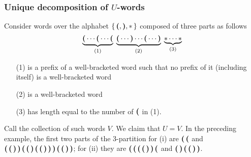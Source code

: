 \subsubsection*{Unique decomposition of $U$-words}
Consider words over the alphabet $\makeset{\pq, \oa, \ast}$ composed
of three parts as follows
\[
\underbrace{\pq \cdots \pq \cdots \pq}_{(1)}
\;
\underbrace{\pq \cdots \oa \cdots \pq \cdots \oa}_{(2)}
\;
\underbrace{\ast \cdots \ast}_{(3)}
\]
\begin{itemize}
\item[{(1)}] is a prefix of a well-bracketed word such that no
prefix of it (including itself) is a well-bracketed word
\item[{(2)}] is a well-bracketed word \item[{(3)}] has length
equal to the number of $\pq$ in (1).
\end{itemize}
Call the collection of such words $V$. We claim that $U = V$. In the
preceding example, the first two parts of the 3-partition for (i) are
$\pq \, \pq$ and $\pq \, \pq \, \oa \, \oa \, \pq \, \pq \, \oa \, \pq
\, \pq \, \oa \, \oa \, \oa \, \pq \, \pq \, \oa \, \oa$; for (ii)
they are $\pq \, \pq \, \pq \, \pq \, \oa \, \oa \, \pq$ and $\pq \,
\oa \, \pq \, \pq \, \oa \, \oa $.



